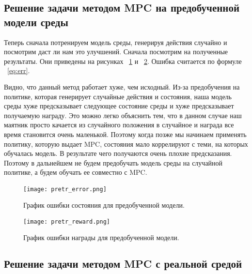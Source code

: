 \subsection{Решение задачи методом MPC на предобученной модели среды}\label{1sec:optimal-control}

Теперь сначала потренируем модель среды, генерируя действия случайно и посмотрим даст ли нам это улучшений. Сначала посмотрим на полученные результаты. Они приведены на рисунках ~\ref{fig:pretr-err} и ~\ref{fig:pretr-reward}. Ошибка считается по формуле ~\ref{eq:err}. 

Видно, что данный метод работает хуже, чем исходный. Из-за предобучения на политике, которая генерирует случайные действия и состояния, наша модель среды хуже предсказывает следующее состояние среды и хуже предсказывает получаемую награду. Это можно легко объяснить тем, что в данном случае наш маятник просто качается из случайного положения в случайное и награда все время становится очень маленькой. Поэтому когда позже мы начинаем применять политику, которую выдает MPC, состояния мало коррелируют с теми, на которых обучалась модель. В результате чего получаются очень плохие предсказания. Поэтому в дальнейшем не будем предобучать модель среды на случайной политике, а будем обучать ее совместно с MPC.

\newpage


\begin{figure}[!htb]
	\centering
	\texttt{[image: pretr\_error.png]}
	\caption {График ошибки состояния для предобученной модели. }
	\label{fig:pretr-err}
\end{figure}


\begin{figure}[!htb]
	\centering
	\texttt{[image: pretr\_reward.png]}
	\caption {График ошибки награды для предобученной модели. }
	\label{fig:pretr-reward}
\end{figure}


\subsection{Решение задачи методом MPC с реальной средой}\label{1sec:optimal-control}

